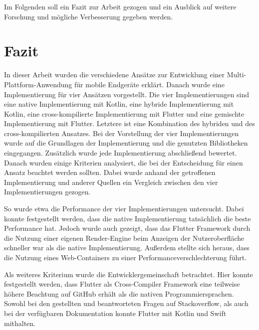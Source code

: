 Im Folgenden soll ein Fazit zur Arbeit gezogen und ein Ausblick auf weitere Forschung und mögliche Verbesserung gegeben werden.

\section{Fazit}
In dieser Arbeit wurden die verschiedene Ansätze zur Entwicklung einer Multi-Plattform-Anwendung für mobile Endgeräte erklärt. Danach wurde eine Implementierung für vier Ansätzen vorgestellt. Die vier Implementierungen sind eine native Implementierung mit Kotlin, eine hybride Implementierung mit Kotlin, eine cross-kompilierte Implementierung mit Flutter und eine gemischte Implementierung mit Flutter. Letztere ist eine Kombination des hybriden und des cross-kompilierten Ansatzes. Bei der Vorstellung der vier Implementierungen wurde auf die Grundlagen der Implementierung und die genutzten Bibliotheken eingegangen. Zusätzlich wurde jede Implementierung abschließend bewertet. Danach wurden einige Kriterien analysiert, die bei der Entscheidung für einen Ansatz beachtet werden sollten. Dabei wurde anhand der getroffenen Implementierung und anderer Quellen ein Vergleich zwischen den vier Implementierungen gezogen.

So wurde etwa die Performance der vier Implementierungen untersucht. Dabei konnte festgestellt werden, dass die native Implementierung tatsächlich die beste Performance hat. Jedoch wurde auch gezeigt, dass das Flutter Framework durch die Nutzung einer eigenen Render-Engine beim Anzeigen der Nutzeroberfläche schneller war als die native Implementierung. Außerdem stellte sich heraus, dass die Nutzung eines Web-Containers zu einer Performanceverschlechterung führt. 


Als weiteres Kriterium wurde die Entwicklergemeinschaft betrachtet.
Hier konnte festgestellt werden, dass Flutter als Cross-Compiler Framework eine teilweise höhere Beachtung auf GitHub erhält als die nativen Programmiersprachen. 
Sowohl bei den gestellten und beantworteten Fragen auf Stackoverflow, als auch bei der verfügbaren Dokumentation konnte Flutter mit Kotlin und Swift mithalten.

